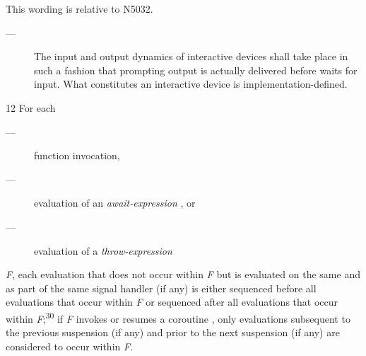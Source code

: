 \newpage
{}\label{api}

This wording is relative to N5032.\cite{Standard}




\begin{description}
    \item[---] The input and output dynamics of interactive devices shall take
               place in such a fashion that prompting output is actually
               delivered before  waits
               for input. What constitutes an interactive device is
               implementation-defined.
\end{description}


12 For each
\begin{description}
    \item[---] function invocation,
    \item[---] evaluation of an \emph{await-expression} , or
    \item[---] evaluation of a \emph{throw-expression} 
\end{description}
\emph{F}, each evaluation that does not occur within \emph{F} but is evaluated on the same
 and as part of the same signal handler (if any) is either sequenced
before all evaluations that occur within \emph{F} or sequenced after all
evaluations that occur within \emph{F};\textsuperscript{30} if \emph{F} invokes or resumes
a coroutine , only evaluations subsequent to the previous
suspension (if any) and prior to the next suspension (if any) are considered
to occur within \emph{F}.


\\


